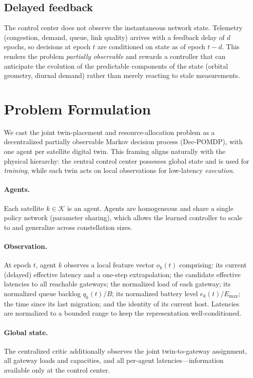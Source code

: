 \documentclass[11pt]{article}
\begin{document}
\subsection{Delayed feedback}
The control center does not observe the instantaneous network state. Telemetry
(congestion, demand, queue, link quality) arrives with a feedback delay of $d$
epochs, so decisions at epoch $t$ are conditioned on state as of epoch $t-d$. This
renders the problem \emph{partially observable} and rewards a controller that can
anticipate the evolution of the predictable components of the state (orbital
geometry, diurnal demand) rather than merely reacting to stale measurements.

\section{Problem Formulation}
\label{sec:mdp}

We cast the joint twin-placement and resource-allocation problem as a
decentralized partially observable Markov decision process (Dec-POMDP), with one
agent per satellite digital twin. This framing aligns naturally with the physical
hierarchy: the central control center possesses global state and is used for
\emph{training}, while each twin acts on local observations for low-latency
\emph{execution}.

\paragraph{Agents.} Each satellite $k \in \mathcal{K}$ is an agent. Agents are
homogeneous and share a single policy network (parameter sharing), which allows
the learned controller to scale to and generalize across constellation sizes.

\paragraph{Observation.} At epoch $t$, agent $k$ observes a local feature vector
$o_k(t)$ comprising: its current (delayed) effective latency and a one-step
extrapolation; the candidate effective latencies to all reachable gateways; the
normalized load of each gateway; its normalized queue backlog $q_k(t)/B$; its
normalized battery level $e_k(t)/E_{\max}$; the time since its last migration; and
the identity of its current host. Latencies are normalized to a bounded range to
keep the representation well-conditioned.

\paragraph{Global state.} The centralized critic additionally observes the joint
twin-to-gateway assignment, all gateway loads and capacities, and all per-agent
latencies---information available only at the control center.
\end{document}
